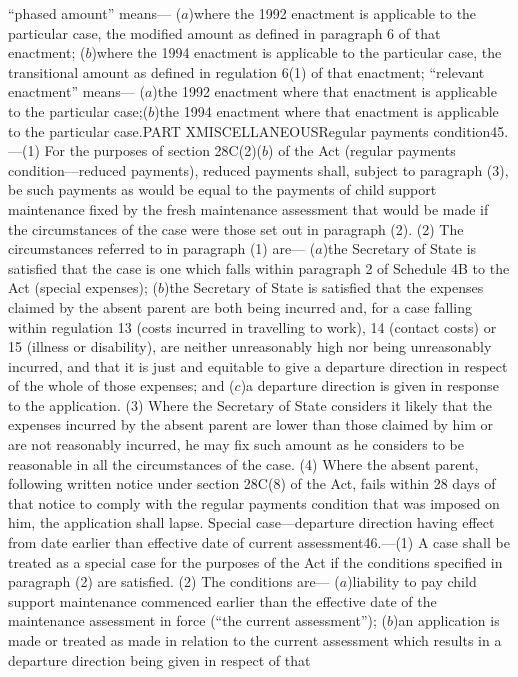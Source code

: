 \documentclass[a4paper]{article}
\begin{document}
“phased amount” means—
($a$)where the 1992 enactment is applicable to the particular case, the modified
amount as defined in paragraph 6 of that enactment;
($b$)where the 1994 enactment is applicable to the particular case, the
transitional amount as defined in regulation 6(1) of that enactment;
“relevant enactment” means—
($a$)the 1992 enactment where that enactment is applicable to the particular case;($b$)the 1994 enactment where that enactment is applicable to the particular case.PART XMISCELLANEOUSRegular payments condition45.—(1) For the purposes of section
28C(2)($b$) of the Act (regular payments condition—reduced payments), reduced
payments shall, subject to paragraph (3), be such payments as would be equal to
the payments of child support maintenance fixed by the fresh maintenance
assessment that would be made if the circumstances of the case were those set
out in paragraph (2).
(2) The circumstances referred to in paragraph (1) are—
($a$)the Secretary of State is satisfied that the case is one which falls within
paragraph 2 of Schedule 4B to the Act (special expenses);
($b$)the Secretary of State is satisfied that the expenses claimed by the absent
parent are both being incurred and, for a case falling within regulation 13
(costs incurred in travelling to work), 14 (contact costs) or 15 (illness or
disability), are neither unreasonably high nor being unreasonably incurred, and
that it is just and equitable to give a departure direction in respect of the
whole of those expenses; and
($c$)a departure direction is given in response to the application.
(3) Where the Secretary of State considers it likely that the expenses incurred
by the absent parent are lower than those claimed by him or are not reasonably
incurred, he may fix such amount as he considers to be reasonable in all the
circumstances of the case.
(4) Where the absent parent, following written notice under section 28C(8) of
the Act, fails within 28 days of that notice to comply with the regular payments
condition that was imposed on him, the application shall lapse.
Special case—departure direction having effect from date earlier than effective
date of current assessment46.—(1) A case shall be treated as a special case for
the purposes of the Act if the conditions specified in paragraph (2) are
satisfied.
(2) The conditions are—
($a$)liability to pay child support maintenance commenced earlier than the
effective date of the maintenance assessment in force (“the current
assessment”);
($b$)an application is made or treated as made in relation to the current
assessment which results in a departure direction being given in respect of that
\end{document}
